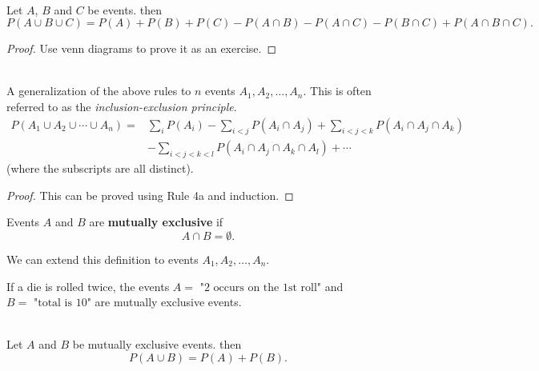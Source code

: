 \begin{theorem}
    \phantom{}  \\
    Let $A$, $B$ and $C$ be events. then
    \[P(A \cup B \cup C) = P(A) + P(B) + P(C) - P(A \cap B) - P(A \cap C) - P(B \cap C) + P(A \cap B \cap C).\]
\end{theorem}

\begin{proof}
    Use venn diagrams to prove it as an exercise.
\end{proof}

\begin{theorem}
    \phantom{}  \\
    A generalization of the above rules to $n$ events $A_1, A_2, \ldots, A_n$. This is often referred to
    as the \textit{inclusion-exclusion principle}.
    \begin{align*}
        P(A_1 \cup A_2 \cup \cdots \cup A_n) = &\sum_{i} P(A_i) - \sum_{i<j} P(A_i \cap A_j)
                                                + \sum_{i<j<k} P(A_i \cap A_j \cap A_k)   \\
                                               &- \sum_{i<j<k<l} P(A_i \cap A_j \cap A_k \cap A_l) + \cdots
    \end{align*}
    (where the subscripts are all distinct).
\end{theorem}

\begin{proof}
    This can be proved using Rule 4a and induction.
\end{proof}

\begin{definition}
    Events $A$ and $B$ are \textbf{mutually exclusive} if \[A \cap B = \emptyset.\]
\end{definition}

\begin{remark}
    We can extend this definition to events $A_1, A_2, \ldots, A_n$.
\end{remark}

\begin{example}
    If a die is rolled twice, the events $A = \text{ "2 occurs on the 1st roll"}$ and
    $B = \text{ "total is 10"}$ are mutually exclusive events.
\end{example}

\begin{theorem}
    \phantom{}  \\
    Let $A$ and $B$ be mutually exclusive events. then
    \[P(A \cup B) = P(A) + P(B).\]
\end{theorem}

